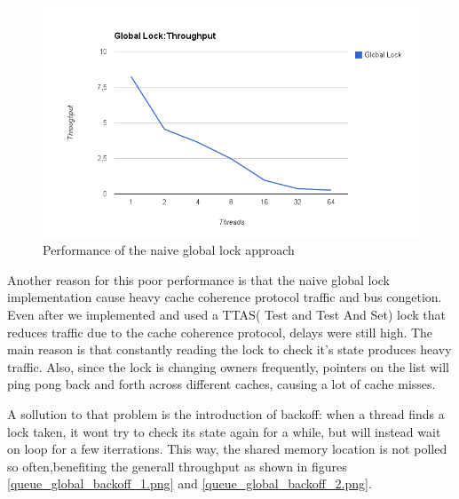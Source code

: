 \begin{figure}
 \centering
  \includegraphics[scale=0.7]{queue_global_lock_perf.png}
\caption{Performance of the naive global lock approach}
\label{queue_global_lock_perf}
\end{figure}


Another reason for this poor performance is that the naive global lock implementation cause heavy cache coherence protocol traffic and bus congetion. Even after we implemented and used a TTAS( Test and Test And Set) lock that reduces traffic due to the cache coherence protocol, delays were still high. The main reason is that constantly reading the lock to check it's state produces heavy traffic. Also, since the lock is changing owners frequently, pointers on the list will ping pong back and forth across different caches, causing a lot of cache misses. 

A sollution to that problem is the introduction of backoff: when a thread finds a lock taken, it wont try to check its state again for a while, but will instead wait on loop for a few iterrations. This way, the shared memory location is not polled so often,benefiting the generall throughput as shown in figures \ref{queue_global_backoff_1.png} and \ref{queue_global_backoff_2.png}.


